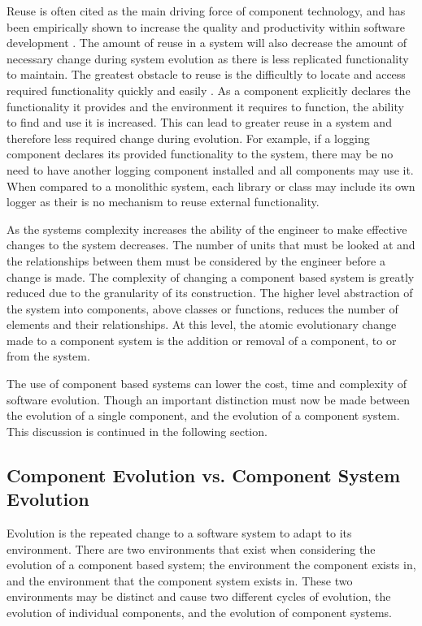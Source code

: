 Reuse is often cited as the main driving force of component technology, and has been empirically shown to increase the quality and productivity within software development \cite{hallsteinsen_experiences_1997}.
The amount of reuse in a system will also decrease the amount of necessary change during system evolution as there is less replicated functionality to maintain.
The greatest obstacle to reuse is the difficultly to locate and access required functionality quickly and easily \cite{ye_supporting_2001}.
As a component explicitly declares the functionality it provides and the environment it requires to function, the ability to find and use it is increased.
This can lead to greater reuse in a system and therefore less required change during evolution.
For example, if a logging component declares its provided functionality to the system, there may be no need to have another logging component installed and all components may use it.
When compared to a monolithic system, each library or class may include its own logger as their is no mechanism to reuse external functionality.

As the systems complexity increases the ability of the engineer to make effective changes to the system decreases.
The number of units that must be looked at and the relationships between them must be considered by the engineer before a change is made.
The complexity of changing a component based system is greatly reduced due to the granularity of its construction.
The higher level abstraction of the system into components, above classes or functions, reduces the number of elements and their relationships.
At this level, the atomic evolutionary change made to a component system is the addition or removal of a component, to or from the system.

The use of component based systems can lower the cost, time and complexity of software evolution.
Though an important distinction must now be made between the evolution of a single component, and the evolution of a component system.
This discussion is continued in the following section.

\subsection{Component Evolution vs. Component System Evolution}
Evolution is the repeated change to a software system to adapt to its environment.
There are two environments that exist when considering the evolution of a component based system; 
the environment the component exists in, and the environment that the component system exists in.
These two environments may be distinct and cause two different cycles of evolution, the evolution of individual components, and the evolution of component systems.

